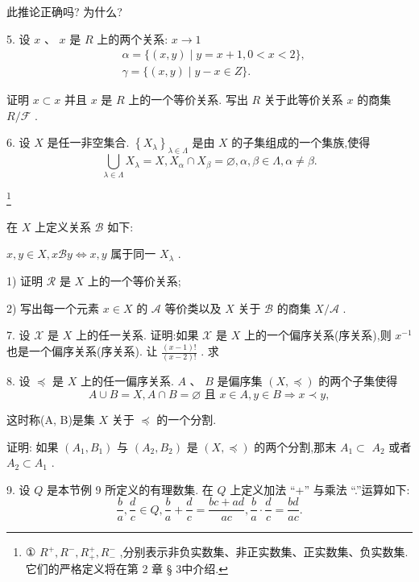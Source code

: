 此推论正确吗? 为什么?

5. 设 $x$ 、 $x$ 是 $R$ 上的两个关系: $x \rightarrow  1$
\begin{align*}
	&\alpha  = \{ \left( {x,y}\right)  \mid  y = x + 1,0 < x < 2\} ,\\
	&\gamma  = \{ \left( {x,y}\right)  \mid  y - x \in  Z\} .
\end{align*}

证明 $x \subset  x$ 并且 $x$ 是 $R$ 上的一个等价关系. 写出 $R$ 关于此等价关系 $x$ 的商集 $R/\mathcal{F}$ .

6. 设 $X$ 是任一非空集合. ${\left\{  {X}_{\lambda }\right\}  }_{\lambda  \in  \Lambda }$ 是由 $X$ 的子集组成的一个集族,使得
$$\mathop{\bigcup }\limits_{{\lambda  \in  \Lambda }}{X}_{\lambda } = X,{X}_{\alpha } \cap  {X}_{\beta } = \varnothing ,\alpha ,\beta  \in  \Lambda ,\alpha  \neq  \beta .$$

\footnote{
	
	① ${R}^{ + },{R}^{ - },{R}_{ + }^{ + },{R}_{ - }^{ - }$ ,分别表示非负实数集、非正实数集、正实数集、负实数集. 它们的严格定义将在第 2 章 § 3中介绍.
	
}

在 $X$ 上定义关系 $\mathcal{B}$ 如下:

$x,y \in  X,x\mathcal{B}y \Leftrightarrow  x,y$ 属于同一 ${X}_{\lambda }$ .

1) 证明 $\mathcal{R}$ 是 $X$ 上的一个等价关系;

2) 写出每一个元素 $x \in  X$ 的 $\mathcal{A}$ 等价类以及 $X$ 关于 $\mathcal{B}$ 的商集 $X/\mathcal{A}$ .

7. 设 $\mathcal{X}$ 是 $X$ 上的任一关系. 证明:如果 $\mathcal{X}$ 是 $X$ 上的一个偏序关系(序关系),则 ${x}^{-1}$ 也是一个偏序关系(序关系). 让 $\frac{\left( {x - 1}\right) !}{\left( {x - 2}\right) !}$ . 求

8. 设 $\preccurlyeq$ 是 $X$ 上的任一偏序关系. $A$ 、 $B$ 是偏序集 $\left( {X, \preccurlyeq  }\right)$ 的两个子集使得
$$A \cup  B = X,A \cap  B = \varnothing \text{ 且 }x \in  A,y \in  B \Rightarrow  x \prec  y,$$

这时称(A, B)是集 $X$ 关于 $\preccurlyeq$ 的一个分割.

证明: 如果 $\left( {{A}_{1},{B}_{1}}\right)$ 与 $\left( {{A}_{2},{B}_{2}}\right)$ 是 $\left( {X, \preccurlyeq  }\right)$ 的两个分割,那末 ${A}_{1} \subset$  ${A}_{2}$ 或者 ${A}_{2} \subset  {A}_{1}$ .

9. 设 $Q$ 是本节例 9 所定义的有理数集. 在 $Q$ 上定义加法 “+” 与乘法 “.”运算如下:
$$\frac{b}{a},\frac{d}{c} \in  Q,\frac{b}{a} + \frac{d}{c} = \frac{{bc} + {ad}}{ac},\frac{b}{a} \cdot  \frac{d}{c} = \frac{bd}{ac}.$$

